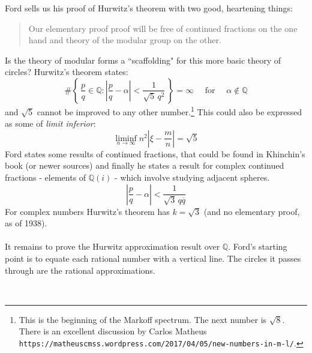 \documentclass[12pt]{article}
\begin{document}
\newpage  

\noindent Ford sells us his proof of Hurwitz's theorem with two good, heartening things:
\begin{quotation} \noindent
Our elementary proof proof will be free of continued fractions on the one hand and theory of the modular group on the other.
\end{quotation}
Is the theory of modular forms a ``scaffolding" for this more basic theory of circles?  Hurwitz's theorem states:
$$\# \left\{ \, \frac{p}{q} \in \mathbb{Q} : \left| \frac{p}{q} - \alpha \right| < \frac{1}{\sqrt{5} \, q^2 } \, \right\} =\infty \quad\text{ for }\quad \alpha \notin \mathbb{Q} $$
and $\sqrt{5}$ cannot be improved to any other number.\footnote{This is the beginning of the Markoff spectrum. The next number is $\sqrt{8}$. There is an excellent discussion by Carlos Matheus \texttt{https://matheuscmss.wordpress.com/2017/04/05/new-numbers-in-m-l/}.}  This could also be expressed as some of \textit{limit inferior}:
$$ \liminf_{n \to \infty}  n^2 \left| \xi - \frac{m}{n} \right| = \sqrt{5}$$
Ford states some results of continued fractions, that could be found in Khinchin's book (or newer sources) and finally he states a result for complex continued fractions - elements of $\mathbb{Q}(i)$ - which involve studying adjacent spheres.
$$\left| \frac{p}{q} - \alpha \right| < \frac{1}{\sqrt{3} \, q \overline{q}}$$
For complex numbers Hurwitz's theorem has $k = \sqrt{3}$ (and no elementary proof, as of 1938). \\  \\
It remains to prove the Hurwitz approximation result over $\mathbb{Q}$.  Ford's starting point is to equate each rational number with a vertical line. The circles it passes through are the rational approximations. \\
 \\
\end{document}
